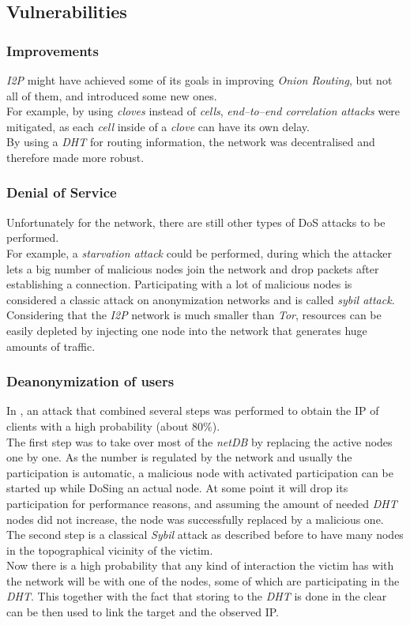 \documentclass{sig-alternate}
\begin{document}
\subsection{Vulnerabilities}
\subsubsection{Improvements}
\emph{I2P} might have achieved some of its goals in improving \emph{Onion Routing}, but not all of them, and introduced some new ones.
\\
For example, by using \emph{cloves} instead of \emph{cells}, \emph{end--to--end correlation attacks} were mitigated, as each \emph{cell} inside of a \emph{clove} can have its own delay.
\\
By using a \emph{DHT} for routing information, the network was decentralised and therefore made more robust\cite{zantout2011}.

\subsubsection{Denial of Service}
Unfortunately for the network, there are still other types of DoS attacks to be performed.
\\
For example, a \emph{starvation attack} could be performed, during which the attacker lets a big number of malicious nodes join the network and drop packets after establishing a connection.
Participating with a lot of malicious nodes is considered a classic attack on anonymization networks and is called \emph{sybil attack}.
\\
Considering that the \emph{I2P} network is much smaller than \emph{Tor}, resources can be easily depleted by injecting one node into the network that generates huge amounts of traffic\cite{zantout2011}.

\subsubsection{Deanonymization of users}
In \cite{egger2013}, an attack that combined several steps was performed to obtain the IP of clients with a high probability (about 80\%).
\\
The first step was to take over most of the \emph{netDB} by replacing the active nodes one by one.
As the number is regulated by the network and usually the participation is automatic, a malicious node with activated participation can be started up while DoSing an actual node.
At some point it will drop its participation for performance reasons, and assuming the amount of needed \emph{DHT} nodes did not increase, the node was successfully replaced by a malicious one.
\\
The second step is a classical \emph{Sybil} attack as described before to have many nodes in the topographical vicinity of the victim.
\\
Now there is a high probability that any kind of interaction the victim has with the network will be with one of the nodes, some of which are participating in the \emph{DHT}.
This together with the fact that storing to the \emph{DHT} is done in the clear can be then used to link the target and the observed IP.
\end{document}
